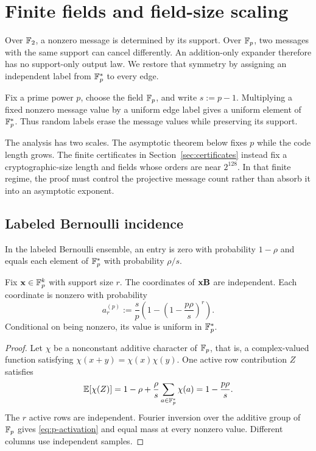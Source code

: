 \section{Finite fields and field-size scaling}
\label{sec:prime-fields}

Over $\mathbb F_2$, a nonzero message is determined by its support.  Over
$\mathbb F_p$, two messages with the same support can cancel differently.  An
addition-only expander therefore has no support-only output law.  We restore
that symmetry by assigning an independent label from $\mathbb F_p^*$ to every edge.

Fix a prime power $p$, choose the field $\mathbb F_p$, and write $s:=p-1$.
Multiplying a fixed nonzero message value
by a uniform edge label gives a uniform element of $\mathbb F_p^*$.  Thus random
labels erase the message values while preserving its support.

The analysis has two scales.  The asymptotic theorem below fixes $p$ while
the code length grows.  The finite certificates in
Section~\ref{sec:certificates} instead fix a cryptographic-size length and
fields whose orders are near $2^{128}$.  In that finite regime, the proof must
control the projective message count rather than absorb it into an
asymptotic exponent.

\subsection{Labeled Bernoulli incidence}

In the labeled Bernoulli ensemble, an entry is zero with probability
$1-\rho$ and equals each element of $\mathbb F_p^*$ with probability $\rho/s$.

\begin{lemma}
\label{lem:p-bernoulli-law}
Fix $\mathbf x\in\mathbb F_p^k$ with support size $r$.  The coordinates of $\mathbf x\mathbf B$ are
independent.  Each coordinate is nonzero with probability
\begin{equation}
 a^{(p)}_r:=\frac{s}{p}
 \left(1-\left(1-\frac{p\rho}{s}\right)^r\right).
 \label{eq:p-activation}
\end{equation}
Conditional on being nonzero, its value is uniform in $\mathbb F_p^*$.
\end{lemma}

\begin{proof}
Let $\chi$ be a nonconstant additive character of $\mathbb F_p$, that is, a
complex-valued function satisfying $\chi(x+y)=\chi(x)\chi(y)$.  One active row
contribution $Z$ satisfies
\[
 \mathbb E[\chi(Z)]
 =1-\rho+\frac{\rho}{s}\sum_{a\in\mathbb F_p^*}\chi(a)
 =1-\frac{p\rho}{s}.
\]
The $r$ active rows are independent.  Fourier inversion over the additive
group of $\mathbb F_p$ gives \eqref{eq:p-activation} and equal mass at every
nonzero value.  Different columns use independent samples.
\end{proof}

